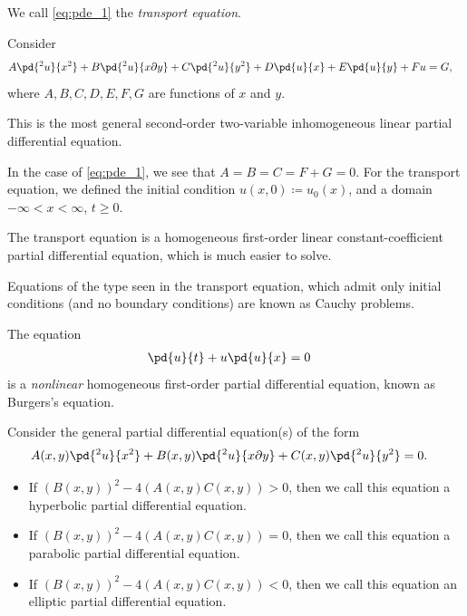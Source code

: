 \documentclass[10pt]{mypackage}
\begin{document}
We call \eqref{eq:pde_1} the \textit{transport equation}.
\begin{example}
  Consider
  \begin{align*}
    A \pd{^2u}{x^2} + B \pd{^2u}{x\partial y} + C \pd{^2u}{y^2} + D \pd{u}{x} + E \pd{u}{y} + F u &= G,
  \end{align*}
  where $A,B,C,D,E,F,G$ are functions of $x$ and $y$.\newline

  This is the most general second-order two-variable inhomogeneous linear partial differential equation.
\end{example}
\begin{example}
  In the case of \eqref{eq:pde_1}, we see that $A = B = C = F + G = 0$. For the transport equation, we defined the initial condition $u\left( x,0 \right) \coloneq u_0\left( x \right)$, and a domain $-\infty < x < \infty$, $t \geq 0$.\newline

  The transport equation is a homogeneous first-order linear constant-coefficient partial differential equation, which is much easier to solve.\newline

  Equations of the type seen in the transport equation, which admit only initial conditions (and no boundary conditions) are known as Cauchy problems.
\end{example}
\begin{example}
  The equation
  \begin{align*}
    \pd{u}{t} + u \pd{u}{x} &= 0
  \end{align*}
  is a \textit{nonlinear} homogeneous first-order partial differential equation, known as Burgers's equation.
\end{example}
\begin{definition}
  Consider the general partial differential equation(s) of the form
  \begin{align*}
    A(x,y) \pd{^2u}{x^2} + B(x,y) \pd{^2u}{x\partial y} + C(x,y)\pd{^2 u}{y^2} &= 0.
  \end{align*}
  \begin{itemize}
    \item If $\left( B(x,y) \right)^2 - 4\left( A\left( x,y \right)C\left( x,y \right) \right) > 0$, then we call this equation a hyperbolic partial differential equation.
    \item If $\left( B(x,y) \right)^2 - 4\left( A\left( x,y \right)C\left( x,y \right) \right) = 0$, then we call this equation a parabolic partial differential equation.
    \item If $\left( B(x,y) \right)^2 - 4\left( A\left( x,y \right)C\left( x,y \right) \right) < 0$, then we call this equation an elliptic partial differential equation.
  \end{itemize}
\end{definition}
\end{document}
